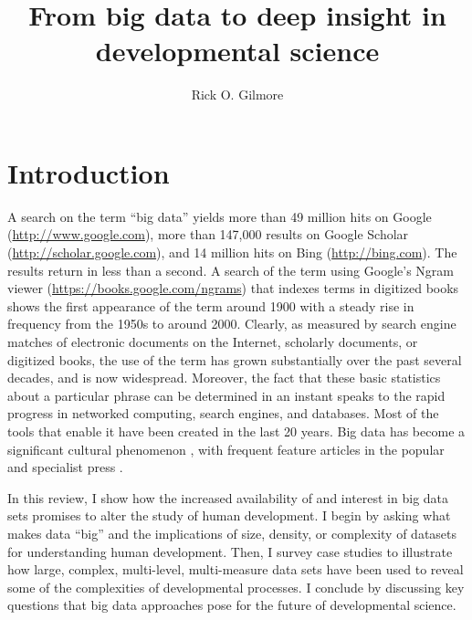 \documentclass[letterpaper,man,apacite,natbib]{apa6}
\title{From big data to deep insight in developmental science}
\author{Rick O. Gilmore}
\affiliation{{The Pennsylvania State University}, {The Databrary Project}}
\begin{document}
\maketitle

\section{Introduction}
A search on the term ``big data'' yields more than 49 million hits on Google (\url{http://www.google.com}), more than 147,000 results on Google Scholar (\url{http://scholar.google.com}), and 14 million hits on Bing (\url{http://bing.com}).
The results return in less than a second.
A search of the term using Google's Ngram viewer (\url{https://books.google.com/ngrams}) that indexes terms in digitized books shows the first appearance of the term around 1900 with a steady rise in frequency from the 1950s to around 2000.
Clearly, as measured by search engine matches of electronic documents on the Internet, scholarly documents, or digitized books, the use of the term has grown substantially over the past several decades, and is now widespread.
Moreover, the fact that these basic statistics about a particular phrase can be determined in an instant speaks to the rapid progress in networked computing, search engines, and databases.
Most of the tools that enable it have been created in the last 20 years.
Big data has become a significant cultural phenomenon \cite{borgman_big_2015,boyd_critical_2012}, with frequent feature articles in the popular \cite{lohr_big_2012,Marcus2013} and specialist press \cite{HBR2015,Press2013a}.

In this review, I show how the increased availability of and interest in big data sets promises to alter the study of human development.
I begin by asking what makes data ``big'' and the implications of size, density, or complexity of datasets for understanding human development.
Then, I survey case studies to illustrate how large, complex, multi-level, multi-measure data sets have been used to reveal some of the complexities of developmental processes.
I conclude by discussing key questions that big data approaches pose for the future of developmental science.
\end{document}
